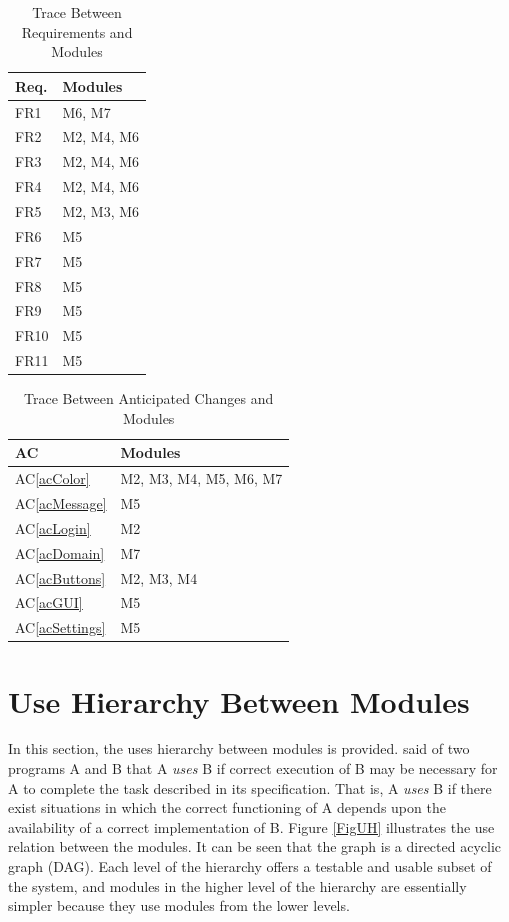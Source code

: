 \documentclass[12pt, titlepage]{article}
\newcommand{\acref}[1]{AC\ref{#1}}
\begin{document}
\begin{table}[H]
\centering
\begin{tabular}{p{} p{}}
\toprule
\textbf{Req.} & \textbf{Modules}\\
\midrule
FR1 & M6, M7\\
FR2 & M2, M4, M6\\
FR3 & M2, M4, M6\\
FR4 & M2, M4, M6\\
FR5 & M2, M3, M6\\
FR6 & M5\\
FR7 & M5\\
FR8 & M5\\
FR9 & M5\\
FR10 & M5\\
FR11 & M5\\
\bottomrule
\end{tabular}
\caption{Trace Between Requirements and Modules}
\label{TblRT}
\end{table}


\begin{table}[H]
\centering
\begin{tabular}{p{} p{}}
\toprule
\textbf{AC} & \textbf{Modules}\\
\midrule
\acref{acColor} & M2, M3, M4, M5, M6, M7\\
\acref{acMessage} & M5\\
\acref{acLogin} & M2\\
\acref{acDomain} & M7\\
\acref{acButtons} & M2, M3, M4\\
\acref{acGUI} & M5\\
\acref{acSettings} & M5\\
\bottomrule
\end{tabular}
\caption{Trace Between Anticipated Changes and Modules}
\label{TblACT}
\end{table}

\section{Use Hierarchy Between Modules} \label{SecUse}

In this section, the uses hierarchy between modules is
provided. \citet{Parnas1978} said of two programs A and B that A {\em uses} B if
correct execution of B may be necessary for A to complete the task described in
its specification. That is, A {\em uses} B if there exist situations in which
the correct functioning of A depends upon the availability of a correct
implementation of B.  Figure \ref{FigUH} illustrates the use relation between
the modules. It can be seen that the graph is a directed acyclic graph
(DAG). Each level of the hierarchy offers a testable and usable subset of the
system, and modules in the higher level of the hierarchy are essentially simpler
because they use modules from the lower levels.
\end{document}
